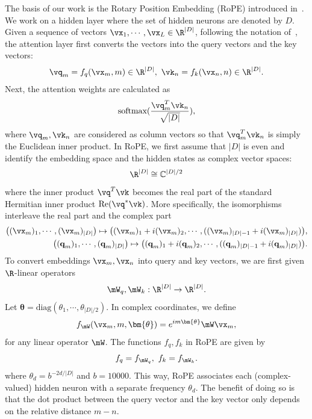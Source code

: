 \documentclass{article} %
\newcommand{\C}{\mathbb{C}}
\begin{document}
The basis of our work is the Rotary Position Embedding (RoPE) introduced in~\citep{su2022roformer}. We work on a hidden layer where the set of hidden neurons are denoted by $D$. Given a sequence of vectors $\vx_1, \cdots, \vx_L\in \R^{|D|}$, following the notation of~\citep{su2022roformer}, the attention layer first converts the vectors into the query vectors and the key vectors:
\begin{align}
\vq_m = f_q(\vx_m, m) \in \R^{|D|}, ~ \vk_n = f_k(\vx_n, n) \in \R^{|D|}.
\end{align}
Next, the attention weights are calculated as
\begin{equation}\label{eq:attention}
\text{softmax}(\dfrac{\vq_m^T\vk_n}{\sqrt{|D|}}),
\end{equation}
where $\vq_m, \vk_n$ are considered as column vectors so that $\vq_m^T\vk_n$ is simply the Euclidean inner product.
In RoPE, we first assume that $|D|$ is even and identify the embedding space and the hidden states as complex vector spaces:
\[\R^{|D|}\cong \C^{|D|/2}\]
where the inner product $\vq^T\vk$ becomes the real part of the standard Hermitian inner product $\text{Re}(\vq^*\vk)$. More specifically, the isomorphisms interleave the real part and the complex part
\begin{align}
\big((\vx_m)_1, \cdots, (\vx_m)_{|D|} \big) \mapsto \big((\vx_m)_1 + i(\vx_m)_2, \cdots, ((\vx_m)_{|D|-1} + i(\vx_m)_{|D|})\big), \\
\big((\textbf{q}_m)_1, \cdots, (\textbf{q}_m)_{|D|} \big) \mapsto \big((\textbf{q}_m)_1 + i(\textbf{q}_m)_2, \cdots, ((\textbf{q}_m)_{|D|-1} + i(\textbf{q}_m)_{|D|})\big).
\end{align}
To convert embeddings $\vx_m, \vx_n$ into query and key vectors, we are first given $\R$-linear operators 
\[
\mW_q, \mW_k: \R^{|D|}\rightarrow \R^{|D|}.
\]
Let $\bm{\theta} = \text{diag}(\theta_1, \cdots, \theta_{|D|/2})$. In complex coordinates, we define
\begin{equation}\label{eq:rope}
f_{\mW}(\vx_m, m, \bm{\theta}) = e^{im\bm{\theta}}\mW\vx_m,
\end{equation}
for any linear operator $\mW$. The functions $f_q, f_k$ in RoPE are given by
\begin{equation}
    f_q = f_{\mW_q}, ~ f_k = f_{\mW_k}.
\end{equation}
where $\theta_d = b^{-2d/|D|}$ and $b=10000$. This way, RoPE associates each (complex-valued) hidden neuron with a separate frequency $\theta_d$. The benefit of doing so is that the dot product between the query vector and the key vector only depends on the relative distance $m - n$.
\end{document}
